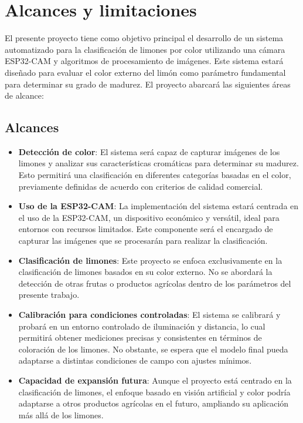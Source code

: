 \section{Alcances y limitaciones}

El presente proyecto tiene como objetivo principal el desarrollo de un sistema automatizado para la clasificación de limones por color utilizando una cámara ESP32-CAM y algoritmos de procesamiento de imágenes. Este sistema estará diseñado para evaluar el color externo del limón como parámetro fundamental para determinar su grado de madurez. El proyecto abarcará las siguientes áreas de alcance:

\subsection{Alcances}
\begin{itemize}
    \item \textbf{Detección de color}: El sistema será capaz de capturar imágenes de los limones y analizar sus características cromáticas para determinar su madurez. Esto permitirá una clasificación en diferentes categorías basadas en el color, previamente definidas de acuerdo con criterios de calidad comercial.
    
    \item \textbf{Uso de la ESP32-CAM}: La implementación del sistema estará centrada en el uso de la ESP32-CAM, un dispositivo económico y versátil, ideal para entornos con recursos limitados. Este componente será el encargado de capturar las imágenes que se procesarán para realizar la clasificación.
    
    \item \textbf{Clasificación de limones}: Este proyecto se enfoca exclusivamente en la clasificación de limones basados en su color externo. No se abordará la detección de otras frutas o productos agrícolas dentro de los parámetros del presente trabajo.
    
    \item \textbf{Calibración para condiciones controladas}: El sistema se calibrará y probará en un entorno controlado de iluminación y distancia, lo cual permitirá obtener mediciones precisas y consistentes en términos de coloración de los limones. No obstante, se espera que el modelo final pueda adaptarse a distintas condiciones de campo con ajustes mínimos.
    
    \item \textbf{Capacidad de expansión futura}: Aunque el proyecto está centrado en la clasificación de limones, el enfoque basado en visión artificial y color podría adaptarse a otros productos agrícolas en el futuro, ampliando su aplicación más allá de los limones. 
\end{itemize}

